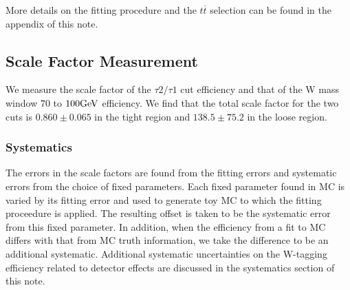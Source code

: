 More details on the fitting procedure and the $t\overline{t}$ selection can be found in the appendix of this note.

\subsection{Scale Factor Measurement}
We measure the scale factor of the $\tau 2/\tau 1$ cut efficiency and that of the W mass window $70$ to $100\mathrm{GeV}$ efficiency. We find that the total scale factor for the two cuts is $0.860 \pm 0.065$ in the tight region and $138.5 \pm 75.2$ in the loose region.

\subsubsection{Systematics}
The errors in the scale factors are found from the fitting errors and systematic errors from the choice of fixed parameters. Each fixed parameter found in MC is varied by its fitting error and used to generate toy MC to which the fitting proceedure is applied. The resulting offset is taken to be the systematic error from this fixed parameter. In addition, when the efficiency from a fit to MC differs with that from MC truth information, we take the difference to be an additional systematic. 
Additional systematic uncertainties on the W-tagging efficiency related to detector effects are discussed in the systematics section of this note.
\clearpage
